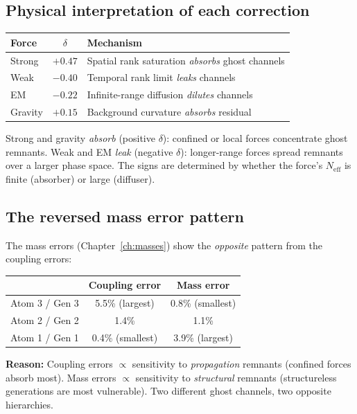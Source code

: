 \subsection{Physical interpretation of each correction}

\begin{center}
\begin{tabular}{lcl}
\hline
Force & $\delta$ & Mechanism \\
\hline
Strong & $+0.47$ & Spatial rank saturation \emph{absorbs} ghost channels \\
Weak & $-0.40$ & Temporal rank limit \emph{leaks} channels \\
EM & $-0.22$ & Infinite-range diffusion \emph{dilutes} channels \\
Gravity & $+0.15$ & Background curvature \emph{absorbs} residual \\
\hline
\end{tabular}
\end{center}

Strong and gravity \emph{absorb} (positive $\delta$): confined or local forces concentrate ghost remnants. Weak and EM \emph{leak} (negative $\delta$): longer-range forces spread remnants over a larger phase space. The signs are determined by whether the force's $N_\text{eff}$ is finite (absorber) or large (diffuser).

\subsection{The reversed mass error pattern}

The mass errors (Chapter~\ref{ch:masses}) show the \emph{opposite} pattern from the coupling errors:

\begin{center}
\begin{tabular}{lcc}
\hline
& Coupling error & Mass error \\
\hline
Atom 3 / Gen 3 & 5.5\% (largest) & 0.8\% (smallest) \\
Atom 2 / Gen 2 & 1.4\% & 1.1\% \\
Atom 1 / Gen 1 & 0.4\% (smallest) & 3.9\% (largest) \\
\hline
\end{tabular}
\end{center}

\textbf{Reason:} Coupling errors $\propto$ sensitivity to \emph{propagation} remnants (confined forces absorb most). Mass errors $\propto$ sensitivity to \emph{structural} remnants (structureless generations are most vulnerable). Two different ghost channels, two opposite hierarchies.

